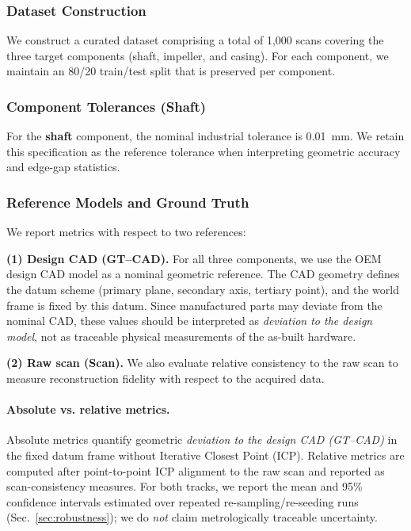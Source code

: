 \documentclass{ieeeaccess}
\begin{document}
\subsubsection{Dataset Construction}
We construct a curated dataset comprising a total of 1,000 scans covering the three target components (shaft, impeller, and casing). For each component, we maintain an 80/20 train/test split that is preserved per component.

\subsubsection{Component Tolerances (Shaft)}
For the \textbf{shaft} component, the nominal industrial tolerance is
\SI{0.01}{\milli\meter}. We retain this specification as the reference
tolerance when interpreting geometric accuracy and edge-gap statistics.

\subsubsection{Reference Models and Ground Truth}
\label{sec:gt}

We report metrics with respect to two references:

\noindent\textbf{(1) Design CAD (GT--CAD).}
For all three components, we use the OEM design CAD model as a nominal geometric reference. The CAD geometry defines the datum scheme (primary plane, secondary axis, tertiary point), and the world frame is fixed by this datum. Since manufactured parts may deviate from the nominal CAD, these values should be interpreted as \emph{deviation to the design model}, not as traceable physical measurements of the as-built hardware.

\noindent\textbf{(2) Raw scan (Scan).}
We also evaluate relative consistency to the raw scan to measure reconstruction fidelity with respect to the acquired data.

\paragraph*{Absolute vs. relative metrics.}
Absolute metrics quantify geometric \emph{deviation to the design CAD (GT--CAD)} in the fixed datum frame without Iterative Closest Point (ICP). Relative metrics are computed after point-to-point ICP alignment to the raw scan and reported as scan-consistency measures. For both tracks, we report the mean and 95\% confidence intervals estimated over repeated re-sampling/re-seeding runs (Sec.~\ref{sec:robustness}); we do \emph{not} claim metrologically traceable uncertainty.
\end{document}
